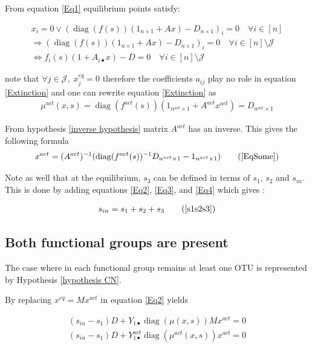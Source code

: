 \documentclass[processes,article,submit,moreauthors,pdftex]{Definitions/mdpi}
\DeclareMathOperator{\diag}{diag}
\begin{document}
From equation \eqref{Eq1} equilibrium points satisfy: 

\begin{align}
x_i = 0 \vee (\diag(f(s))(1_{n\times 1} + Ax) - D_{n\times 1})_i = 0 \quad \forall i \in [n] \\
\Rightarrow  (\diag (f(s))(1_{n\times 1}+ Ax) - D_{n\times 1})_i = 0 \quad \forall i \in [n]\setminus \mathcal{J} \\
\Leftrightarrow f_i(s)(1 + A_{i\bullet}x) - D = 0 \quad \forall i \in [n]\setminus \mathcal{J} \label{Extinction}
\end{align} 

note that $\forall j \in \mathcal{J}, \; x^{eq}_j = 0 $ therefore the coefficients $a_{ij}$ play no role in equation \eqref{Extinction} and one can rewrite equation \eqref{Extinction} as 
\begin{align} 
\label{mu=D}\mu^{act}(x,s) = \diag(f^{act}(s))(1_{n^{act}\times 1} + A^{act}x^{act}) = D_{n^{act} \times 1} 
\end{align}

From hypothesis \ref{inverse hypothesis} matrix $A^{act}$ has an inverse. This gives the following formula
\begin{align}
x^{act} = (A^{act})^{-1}(\diag(f^{act}(s))^{-1}D_{n^{act}\times 1} - 1_{n^{act}\times 1}) \tag{\ref{EqSome}}
\end{align} 



Note as well that at the equilibrium, $s_3$ can be defined in terms of $s_1$, $s_2$ and $s_{in}$. This is done by adding equations \eqref{Eq2}, \eqref{Eq3},  and \eqref{Eq4} which gives :

\begin{align}
s_{in} = s_1+s_2+s_3 \tag{\ref{s1s2s3}}
\end{align}

\subsection{Both functional groups are present}

The case where in each functional group remains at least one OTU is represented by Hypothesis \ref{hypothesis CN}.

By replacing $x^{eq} = Mx^{act}$ in equation \eqref{Eq2} yields


\begin{align}
(s_{in}-s_1)D + Y_{1\bullet} \diag(\mu(x,s))Mx^{act}  = 0 \\
(s_{in}-s_1)D + Y^{act}_{1\bullet} \diag(\mu^{act}(x,s))x^{act}  = 0 
\end{align}
\end{document}

